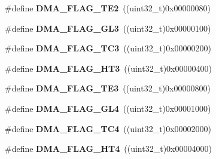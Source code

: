 \begin{DoxyCompactItemize}
\item 
\hypertarget{group___d_m_a__flag__definitions_ga6d81cc881182d35ba7a34c2759cd97f3}{\#define {\bfseries D\-M\-A\-\_\-\-F\-L\-A\-G\-\_\-\-T\-E2}~((uint32\-\_\-t)0x00000080)}\label{group___d_m_a__flag__definitions_ga6d81cc881182d35ba7a34c2759cd97f3}

\item 
\hypertarget{group___d_m_a__flag__definitions_ga245f18e8c146baf3596e7340f7ecae3b}{\#define {\bfseries D\-M\-A\-\_\-\-F\-L\-A\-G\-\_\-\-G\-L3}~((uint32\-\_\-t)0x00000100)}\label{group___d_m_a__flag__definitions_ga245f18e8c146baf3596e7340f7ecae3b}

\item 
\hypertarget{group___d_m_a__flag__definitions_ga17463fb2609ad37aebe6955a044e83c7}{\#define {\bfseries D\-M\-A\-\_\-\-F\-L\-A\-G\-\_\-\-T\-C3}~((uint32\-\_\-t)0x00000200)}\label{group___d_m_a__flag__definitions_ga17463fb2609ad37aebe6955a044e83c7}

\item 
\hypertarget{group___d_m_a__flag__definitions_gad28ea63fda2c87dd5e2ec08e0ab407d4}{\#define {\bfseries D\-M\-A\-\_\-\-F\-L\-A\-G\-\_\-\-H\-T3}~((uint32\-\_\-t)0x00000400)}\label{group___d_m_a__flag__definitions_gad28ea63fda2c87dd5e2ec08e0ab407d4}

\item 
\hypertarget{group___d_m_a__flag__definitions_ga3e3d70e09d144c82ffc17d2ece186339}{\#define {\bfseries D\-M\-A\-\_\-\-F\-L\-A\-G\-\_\-\-T\-E3}~((uint32\-\_\-t)0x00000800)}\label{group___d_m_a__flag__definitions_ga3e3d70e09d144c82ffc17d2ece186339}

\item 
\hypertarget{group___d_m_a__flag__definitions_ga4dc75a03066b5e3700cb650daf4731e2}{\#define {\bfseries D\-M\-A\-\_\-\-F\-L\-A\-G\-\_\-\-G\-L4}~((uint32\-\_\-t)0x00001000)}\label{group___d_m_a__flag__definitions_ga4dc75a03066b5e3700cb650daf4731e2}

\item 
\hypertarget{group___d_m_a__flag__definitions_gafb3f8a8c7048d344865c47e72a598074}{\#define {\bfseries D\-M\-A\-\_\-\-F\-L\-A\-G\-\_\-\-T\-C4}~((uint32\-\_\-t)0x00002000)}\label{group___d_m_a__flag__definitions_gafb3f8a8c7048d344865c47e72a598074}

\item 
\hypertarget{group___d_m_a__flag__definitions_ga1a766ffe9b0138d6ab42819c1a9206f1}{\#define {\bfseries D\-M\-A\-\_\-\-F\-L\-A\-G\-\_\-\-H\-T4}~((uint32\-\_\-t)0x00004000)}\label{group___d_m_a__flag__definitions_ga1a766ffe9b0138d6ab42819c1a9206f1}


\end{DoxyCompactItemize}
